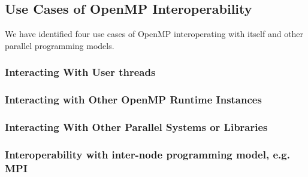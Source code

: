 
\subsection{Use Cases of OpenMP Interoperability}
We have identified four use cases of OpenMP interoperating with itself and other parallel programming models. 
\subsubsection{Interacting With User threads}


\subsubsection{Interacting with Other OpenMP Runtime Instances}


\subsubsection{Interacting With Other Parallel Systems or Libraries}


\subsubsection{Interoperability with inter-node programming model, e.g. MPI}




